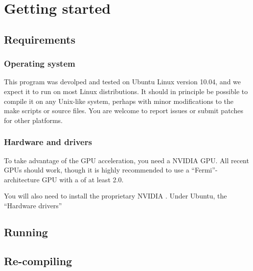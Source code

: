 \section{Getting started}

\subsection{Requirements}

\subsubsection{Operating system}

This program was devolped and tested on Ubuntu Linux version 10.04, and we expect it to run on most Linux distributions. It should in principle be possible to compile it on any Unix-like system, perhaps with minor modifications to the make scripts or source files. You are welcome to report issues or submit patches for other platforms.

\subsubsection{Hardware and drivers}


To take advantage of the GPU acceleration, you need a  \textsc{NVIDIA} GPU. All recent GPUs should work, though it is highly recommended to use a ``Fermi''-architecture GPU with a  of at least 2.0.

You will also need to install the proprietary \textsc{NVIDIA} . Under Ubuntu, the ``Hardware drivers'' 


\subsection{Running}



\subsection{Re-compiling}




